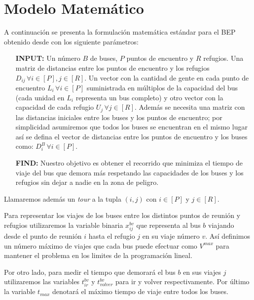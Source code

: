 \documentclass[letter, 10pt]{article}
\begin{document}
\section{Modelo Matemático}\label{sec:mod}
    A continuación se presenta la formulación matemática estándar para el BEP
    obtenido desde \cite{goerigk2013branch} con los siguiente parámetros:
    \begin{itemize}
        \item[\textbf{INPUT:}]
            Un número $B$ de buses, $P$ puntos de encuentro y $R$ refugios. Una
            matriz de distancias entre los puntos de encuentro y los refugios
            $D_{ij}\,\forall i\in [P], j\in [R]$. Un vector con la cantidad de
            gente en cada punto de encuentro $L_i\, \forall i\in [P]$
            suministrada en múltiplos de la capacidad del bus (cada unidad en
            $L_i$ representa un bus completo) y otro vector con
            la capacidad de cada refugio $U_j\, \forall j\in  [R]$. Además se
            necesita una matriz con las distancias iniciales entre los buses y
            los puntos de encuentro; por simplicidad asumiremos que todos los
            buses se encuentran en el mismo lugar así se defina el vector de
            distancias entre los puntos de encuentro y los buses como: $D^B_i\,
            \forall i\in [P]$.
        \item[\textbf{FIND:}]
            Nuestro objetivo es obtener el recorrido que minimiza el tiempo de
            viaje del bus que demora más respetando las capacidades de los buses
            y los refugios sin dejar a nadie en la zona de peligro.
    \end{itemize}

    Llamaremos además un \emph{tour} a la tupla $(i, j)$ con $i\in [P]$ y 
    $j\in [R]$.

    Para representar los viajes de los buses entre los distintos puntos de
    reunión y refugios utilizaremos la variable binaria $x^{bv}_{ij}$ que
    representa al bus $b$ viajando desde el punto de reunión $i$ hasta el
    refugio $j$ en su viaje número $v$. Así definimos un número máximo de 
    viajes que cada bus puede efectuar como $V^{max}$ para mantener el problema
    en los limites de la programación lineal.

    Por otro lado, para medir el tiempo que demorará el bus $b$ en sus viajes 
    $j$ utilizaremos las variables $t^{bv}_{ir}$ y $t^{bv}_{volver}$ para ir y
    volver respectivamente. Por último la variable $t_{max}$ denotará el máximo
    tiempo de viaje entre todos los buses.
\end{document}
